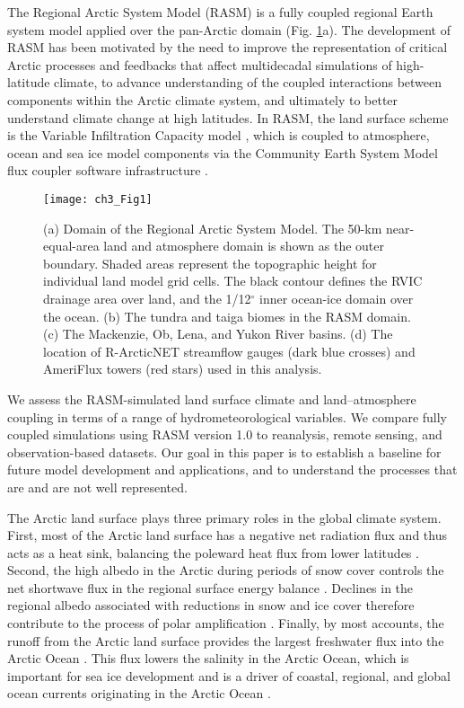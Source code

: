 The Regional Arctic System Model (RASM) is a fully coupled regional Earth system model \citep{Roberts_2015a} applied over the pan-Arctic domain (Fig. \ref{fig:domain}a).
The development of RASM has been motivated by the need to improve the representation of critical Arctic processes and feedbacks that affect multidecadal simulations of high-latitude climate, to advance understanding of the coupled interactions between components within the Arctic climate system, and ultimately to better understand climate change at high latitudes.
In RASM, the land surface scheme is the Variable Infiltration Capacity model \citep[VIC; ][]{Liang_1994,Liang_1996}, which is coupled to atmosphere, ocean and sea ice model components via the Community Earth System Model \citep[CESM;][]{Hurrell_2013} flux coupler software infrastructure \citep{Craig_2012}.

\begin{figure}
  \centering
  \texttt{[image: ch3\_Fig1]}
  \caption{(a) Domain of the Regional Arctic System Model.
  The 50-km near-equal-area land and atmosphere domain is shown as the outer boundary.
  Shaded areas represent the topographic height for individual land model grid cells.
  The black contour defines the RVIC drainage area over land, and the 1/12$^{\circ}$ inner ocean-ice domain over the ocean.
  (b) The tundra and taiga biomes in the RASM domain.
  (c) The Mackenzie, Ob, Lena, and Yukon River basins.
  (d) The location of R-ArcticNET streamflow gauges (dark blue crosses) and AmeriFlux towers (red stars) used in this analysis.}
  \label{fig:domain}
\end{figure}

We assess the RASM-simulated land surface climate and land–atmosphere coupling in terms of a range of hydrometeorological variables.
We compare fully coupled simulations using RASM version 1.0 to reanalysis, remote sensing, and observation-based datasets.
Our goal in this paper is to establish a baseline for future model development and applications, and to understand the processes that are and are not well represented.

The Arctic land surface plays three primary roles in the global climate system.
First, most of the Arctic land surface has a negative net radiation flux and thus acts as a heat sink, balancing the poleward heat flux from lower latitudes \citep{Fasullo_2008}.
Second, the high albedo in the Arctic during periods of snow cover controls the net shortwave flux in the regional surface energy balance \citep{Flanner_2011}.
Declines in the regional albedo associated with reductions in snow and ice cover therefore contribute to the process of polar amplification \citep{Serreze_2006c}.
Finally, by most accounts, the runoff from the Arctic land surface provides the largest freshwater flux into the Arctic Ocean \citep{Serreze_2006a}.
This flux lowers the salinity in the Arctic Ocean, which is important for sea ice development and is a driver of coastal, regional, and global ocean currents originating in the Arctic Ocean \citep{Morison_2012,Serreze_2006a}.

